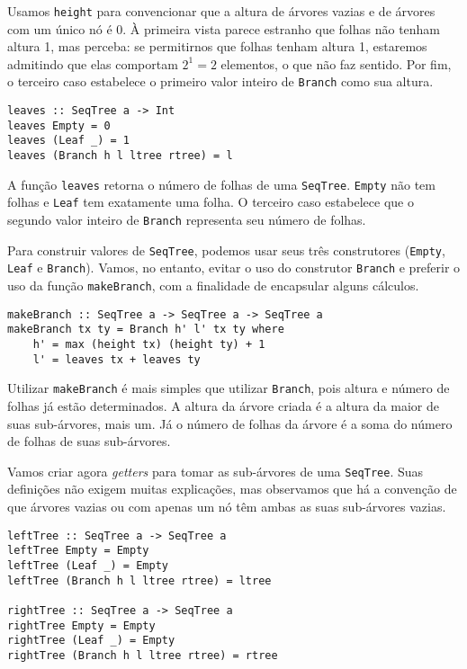 \documentclass[a4paper]{article}
\begin{document}
Usamos \texttt{height} para convencionar que a altura de árvores vazias e de árvores com um único nó é 0.
À primeira vista parece estranho que folhas não tenham altura 1, mas perceba: se permitirnos que folhas tenham altura 1, estaremos admitindo que elas comportam $2^1 = 2$ elementos, o que não faz sentido.
Por fim, o terceiro caso estabelece o primeiro valor inteiro de \texttt{Branch} como sua altura.

\begin{verbatim}
leaves :: SeqTree a -> Int
leaves Empty = 0
leaves (Leaf _) = 1
leaves (Branch h l ltree rtree) = l
\end{verbatim}

A função \texttt{leaves} retorna o número de folhas de uma \texttt{SeqTree}.
\texttt{Empty} não tem folhas e \texttt{Leaf} tem exatamente uma folha.
O terceiro caso estabelece que o segundo valor inteiro de \texttt{Branch} representa seu número de folhas.

Para construir valores de \texttt{SeqTree}, podemos usar seus três construtores (\texttt{Empty}, \texttt{Leaf} e \texttt{Branch}).
Vamos, no entanto, evitar o uso do construtor \texttt{Branch} e preferir o uso da função \texttt{makeBranch}, com a finalidade de encapsular alguns cálculos.

\begin{verbatim}
makeBranch :: SeqTree a -> SeqTree a -> SeqTree a
makeBranch tx ty = Branch h' l' tx ty where
	h' = max (height tx) (height ty) + 1
	l' = leaves tx + leaves ty
\end{verbatim}

Utilizar \texttt{makeBranch} é mais simples que utilizar \texttt{Branch}, pois altura e número de folhas já estão determinados.
A altura da árvore criada é a altura da maior de suas sub-árvores, mais um.
Já o número de folhas da árvore é a soma do número de folhas de suas sub-árvores.

Vamos criar agora \emph{getters} para tomar as sub-árvores de uma \texttt{SeqTree}.
Suas definições não exigem muitas explicações, mas observamos que há a convenção de que árvores vazias ou com apenas um nó têm ambas as suas sub-árvores vazias.

\begin{verbatim}
leftTree :: SeqTree a -> SeqTree a
leftTree Empty = Empty
leftTree (Leaf _) = Empty
leftTree (Branch h l ltree rtree) = ltree

rightTree :: SeqTree a -> SeqTree a
rightTree Empty = Empty
rightTree (Leaf _) = Empty
rightTree (Branch h l ltree rtree) = rtree
\end{verbatim}
\end{document}
